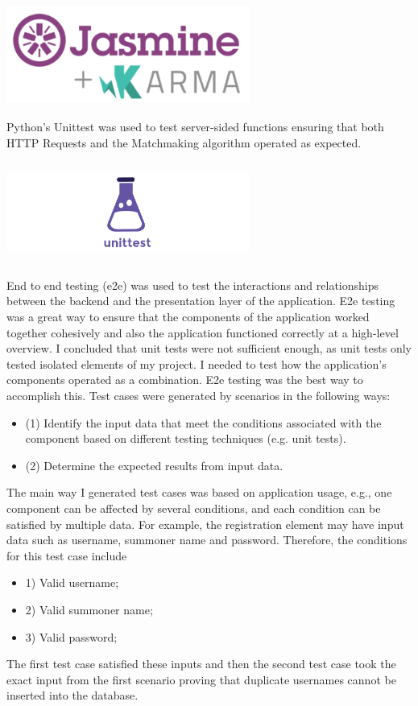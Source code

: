 \begin{center}    
	\includegraphics[width=8cm,height=3.3cm,keepaspectratio]{img/Jasmine_and_Karma.png}
\end{center}
Python’s Unittest was used to test server-sided functions ensuring that both HTTP Requests and the Matchmaking algorithm operated as expected.
\begin{center}    
	\includegraphics[width=8cm,height=3.3cm,keepaspectratio]{img/Unittest.png}
\end{center}
End to end testing (e2e) was used to test the interactions and relationships between the backend and the presentation layer of the application. E2e testing was a great way to ensure that the components of the application worked together cohesively and also the application functioned correctly at a high-level overview. I concluded that unit tests were not sufficient enough, as unit tests only tested isolated elements of my project. I needed to test how the application's components operated as a combination. E2e testing was the best way to accomplish this.
Test cases were generated by scenarios in the following ways:~\cite{bai2001distributed}
\begin{itemize}
	\item (1) Identify the input data that meet the conditions associated with the component based on different testing techniques (e.g. unit tests).
	\item (2) Determine the expected results from input data. 
\end{itemize}
The main way I generated test cases was based on application usage, e.g., one component can be affected by several conditions, and each condition can be satisfied by multiple data. For example, the registration element may have input data such as username, summoner name and password. Therefore, the conditions for this test case include
\begin{itemize}
	\item 1) Valid username; 
	\item 2) Valid summoner name; 
	\item 3) Valid password;
\end{itemize}
The first test case satisfied these inputs and then the second test case took the exact input from the first scenario proving that duplicate usernames cannot be inserted into the database.

